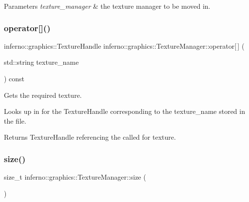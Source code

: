 \begin{DoxyParams}{Parameters}
{\em texture\+\_\+manager} & the texture manager to be moved in. \\
\hline
\end{DoxyParams}
\mbox{\label{classinferno_1_1graphics_1_1_texture_manager_a419b62740d0cbff686820b9b4ccc95e2}} 
\subsubsection{\texorpdfstring{operator[]()}{operator[]()}}
{\footnotesize\ttfamily inferno\+::graphics\+::\+Texture\+Handle inferno\+::graphics\+::\+Texture\+Manager\+::operator\mbox{[}$\,$\mbox{]} (\begin{DoxyParamCaption}\item[{std\+::string}]{texture\+\_\+name }\end{DoxyParamCaption}) const}



Gets the required texture. 

Looks up in for the Texture\+Handle corresponding to the texture\+\_\+name stored in the file. \begin{DoxyReturn}{Returns}
Texture\+Handle referencing the called for texture. 
\end{DoxyReturn}
\mbox{\label{classinferno_1_1graphics_1_1_texture_manager_a7b5b7ee8f6c1a65f63de017a933549ef}} 
\subsubsection{\texorpdfstring{size()}{size()}}
{\footnotesize\ttfamily size\+\_\+t inferno\+::graphics\+::\+Texture\+Manager\+::size (\begin{DoxyParamCaption}{ }\end{DoxyParamCaption})\hspace{0.3cm}{\ttfamily [inline]}}



